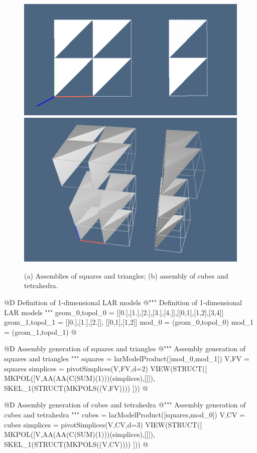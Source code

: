 \documentclass[11pt,oneside]{article}	%
\begin{document}
\begin{figure}[htbp] %
   \centering
   \includegraphics[width=0.405\linewidth]{images/assembly1} 
   \includegraphics[width=0.315\linewidth]{images/assembly2} 
   \caption{(a) Assemblies of squares and triangles; (b) assembly of cubes and tetrahedra.}
   \label{fig:example}
\end{figure}

@D Definition of 1-dimensional LAR models 
@{""" Definition of 1-dimensional LAR models  """
geom_0,topol_0 = [[0.],[1.],[2.],[3.],[4.]],[[0,1],[1,2],[3,4]]
geom_1,topol_1 = [[0.],[1.],[2.]], [[0,1],[1,2]]
mod_0 = (geom_0,topol_0)
mod_1 = (geom_1,topol_1)
@}

@D Assembly generation of squares and triangles
@{""" Assembly generation of squares and triangles """
squares = larModelProduct([mod_0,mod_1])
V,FV = squares
simplices = pivotSimplices(V,FV,d=2)
VIEW(STRUCT([ MKPOL([V,AA(AA(C(SUM)(1)))(simplices),[]]),
			  SKEL_1(STRUCT(MKPOLS((V,FV)))) ]))
@}

@D Assembly generation  of cubes and tetrahedra 
@{""" Assembly generation  of cubes and tetrahedra """
cubes = larModelProduct([squares,mod_0])
V,CV = cubes
simplices = pivotSimplices(V,CV,d=3)
VIEW(STRUCT([ MKPOL([V,AA(AA(C(SUM)(1)))(simplices),[]]),
			  SKEL_1(STRUCT(MKPOLS((V,CV)))) ]))
@}









\end{document}
